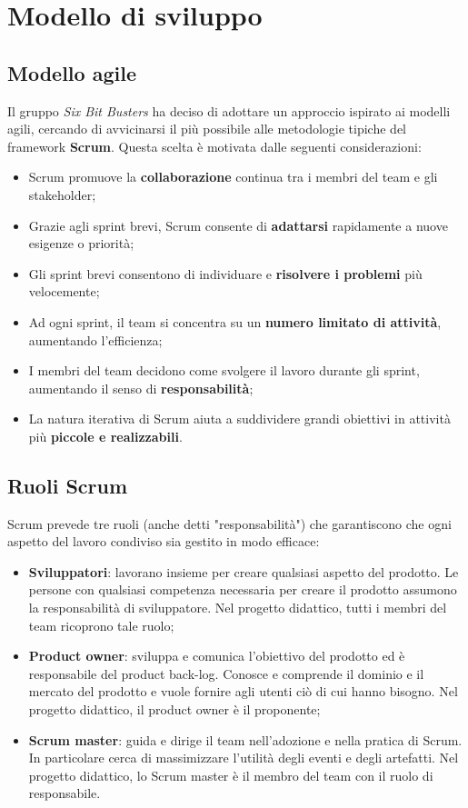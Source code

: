 \section{Modello di sviluppo}
\subsection{Modello agile}
Il gruppo \textit{Six Bit Busters} ha deciso di adottare un approccio ispirato
ai modelli agili, cercando di avvicinarsi il più possibile alle metodologie
tipiche del framework \textbf{Scrum}. Questa scelta è motivata dalle seguenti
considerazioni:
\begin{itemize}
    \item Scrum promuove la \textbf{collaborazione} continua tra i membri del team e gli
          stakeholder;
    \item Grazie agli sprint brevi, Scrum consente di \textbf{adattarsi} rapidamente a
          nuove esigenze o priorità;
    \item Gli sprint brevi consentono di individuare e \textbf{risolvere i problemi} più
          velocemente;
    \item Ad ogni sprint, il team si concentra su un \textbf{numero limitato di
              attività}, aumentando l'efficienza;
    \item I membri del team decidono come svolgere il lavoro durante gli sprint,
          aumentando il senso di \textbf{responsabilità};
    \item La natura iterativa di Scrum aiuta a suddividere grandi obiettivi in attività
          più \textbf{piccole e realizzabili}.
\end{itemize}

\subsection{Ruoli Scrum}
Scrum prevede tre ruoli (anche detti "responsabilità") che garantiscono che
ogni aspetto del lavoro condiviso sia gestito in modo efficace:
\begin{itemize}
    \item \textbf{Sviluppatori}: lavorano insieme per creare qualsiasi
          aspetto del prodotto. Le persone con qualsiasi competenza necessaria
          per creare il prodotto assumono la responsabilità di sviluppatore. Nel
          progetto didattico, tutti i membri del team ricoprono tale ruolo;
    \item \textbf{Product owner}: sviluppa e comunica l'obiettivo del prodotto
          ed è responsabile del product back-log. %
          Conosce e comprende il dominio e il
          mercato del prodotto e vuole fornire agli utenti ciò di cui hanno bisogno.
          Nel progetto didattico, il product owner è il proponente;
    \item \textbf{Scrum master}: guida e dirige il team nell'adozione e
          nella pratica di Scrum. In particolare cerca di massimizzare l'utilità
          degli eventi e degli artefatti. Nel progetto didattico, lo Scrum master è
          il membro del team con il ruolo di responsabile.
\end{itemize}

